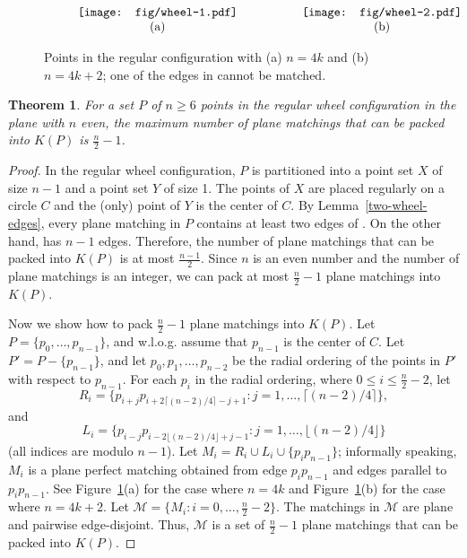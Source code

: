 \documentclass[11pt,a4paper]{article}
\newcommand{\CH}[1]{\text{$CH(#1)$}}
\newcommand{\Kn}[1]{K#1}
\newtheorem{theorem}{Theorem}
\begin{document}
\begin{figure}[htb]
  \centering
\setlength{\tabcolsep}{0in}
  $\begin{tabular}{cc}

\multicolumn{1}{m{.5\columnwidth}}{\centering\texttt{[image: fig/wheel-1.pdf]}}
&\multicolumn{1}{m{.5\columnwidth}}{\centering\texttt{[image: fig/wheel-2.pdf]}} \\
(a) & (b)
\end{tabular}$
  \caption{Points in the regular configuration with (a) $n=4k$ and (b) $n=4k+2$; one of the edges in \CH{P} cannot be matched.}
\label{wheel-fig}
\end{figure}

\begin{theorem}
\label{wheel}
For a set $P$ of $n\ge 6$ points in the regular wheel configuration in the plane with $n$ even, the maximum number of plane matchings that can be packed into $\Kn{(P)}$ is $\frac{n}{2}-1$.
\end{theorem}
\begin{proof}
In the regular wheel configuration, $P$ is partitioned into a point set $X$ of size $n-1$ and a point set $Y$ of size 1. The points of $X$ are placed regularly on a circle $C$ and the (only) point of $Y$ is the center of $C$. By Lemma~\ref{two-wheel-edges}, every plane matching in $P$ contains at least two edges of \CH{P}. On the other hand, \CH{P} has $n-1$ edges. Therefore, the number of plane matchings that can be packed into $\Kn{(P)}$ is at most $\frac{n-1}{2}$. Since $n$ is an even number and the number of plane matchings is an integer, we can pack at most $\frac{n}{2}-1$ plane matchings into $\Kn{(P)}$.

Now we show how to pack $\frac{n}{2}-1$ plane matchings into $\Kn{(P)}$.
Let $P=\{p_0,\dots,p_{n-1}\}$, and w.l.o.g. assume that $p_{n-1}$ is the center of $C$. Let $P'=P-\{p_{n-1}\}$, and let $p_0,p_1,\dots,p_{n-2}$ be the radial ordering of the points in $P'$ with respect to $p_{n-1}$. For each $p_i$ in the radial ordering, where $0\le i\le \frac{n}{2}-2$, let $$R_i=\{p_{i+j}p_{i+2\lceil(n-2)/4\rceil-j+1}:j=1,\dots,\lceil(n-2)/4\rceil\},$$ and $$L_i=\{p_{i-j}p_{i-2\lfloor(n-2)/4\rfloor+j-1}:j=1,\dots,\lfloor(n-2)/4\rfloor\}$$ (all indices are modulo $n-1$). Let $M_i=R_i\cup L_i\cup \{p_ip_{n-1}\}$; informally speaking, $M_i$ is a plane perfect matching obtained from edge $p_ip_{n-1}$ and edges parallel to $p_ip_{n-1}$. See Figure~\ref{wheel-fig}(a) for the case where $n=4k$ and Figure~\ref{wheel-fig}(b) for the case where $n=4k+2$. Let $\mathcal{M}=\{M_i:i=0,\dots,\frac{n}{2}-2\}$. The matchings in $\mathcal{M}$ are plane and pairwise edge-disjoint. Thus, $\mathcal{M}$ is a set of $\frac{n}{2}-1$ plane matchings that can be packed into $\Kn{(P)}$. 
\end{proof}
\end{document}
